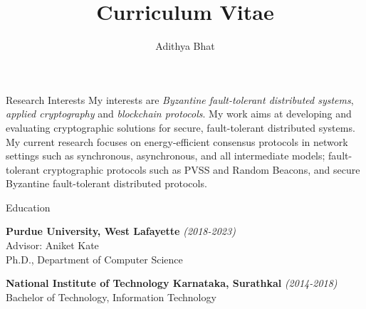 \documentclass{resume}
\author{Adithya Bhat}
\date{}
\title{Curriculum Vitae}
\begin{document}
\begin{rSection}{Research Interests}
\label{sec:orgdea95f7}
My interests are \emph{Byzantine fault-tolerant distributed systems}, \emph{applied cryptography} and \emph{blockchain protocols}.
My work aims at developing and evaluating cryptographic solutions for secure, fault-tolerant distributed systems.
My current research focuses on energy-efficient consensus protocols in network settings such as synchronous, asynchronous, and all intermediate models; fault-tolerant cryptographic protocols such as PVSS and Random Beacons, and secure Byzantine fault-tolerant distributed protocols.
\end{rSection}
\begin{rSection}{Education}
\label{sec:org5f8902f}
 \item  \textbf{Purdue University, West Lafayette}
 \hfill  \emph{(2018-2023)}\\[0pt]
    Advisor: Aniket Kate\\[0pt]
    Ph.D., Department of Computer Science

 \item  \textbf{National Institute of Technology Karnataka, Surathkal}
 \hfill  \emph{(2014-2018)}\\[0pt]
    Bachelor of Technology, Information Technology
\end{rSection}
\end{document}
